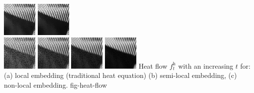\documentclass[final]{siamltex}
\newcommand{\heat}{\text{h}}
\newcommand{\F}{f}
\begin{document}
{\includegraphics[width=0.22\linewidth]{diffusion/barb/img/barb-denoising-neigh-5.png}
\includegraphics[width=0.22\linewidth]{diffusion/barb/img/barb-denoising-neigh-6.png}\\\vspace{1mm}
\includegraphics[width=0.22\linewidth]{diffusion/barb/img/barb-denoising-un-normalized-1.png}
\includegraphics[width=0.22\linewidth]{diffusion/barb/img/barb-denoising-un-normalized-3.png}
\includegraphics[width=0.22\linewidth]{diffusion/barb/img/barb-denoising-un-normalized-4.png}
\includegraphics[width=0.22\linewidth]{diffusion/barb/img/barb-denoising-un-normalized-5.png}
}{
Heat flow $\F_t^{\heat}$ with an increasing $t$ for: (a) local embedding (traditional heat equation)
(b) semi-local embedding, (c) non-local embedding. 
%
}{fig-heat-flow}
\end{document}

